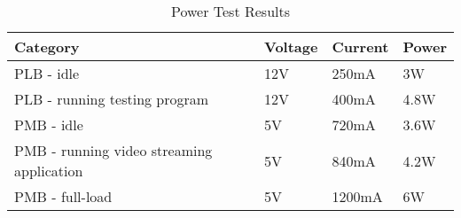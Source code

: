 \begin{table}[H]
    \caption{Power Test Results}
	\centering
	\begin{tabular}{llll}
	\hline
	\textbf{Category} & \textbf{Voltage} & \textbf{Current} & \textbf{Power} \\
	\hline
    PLB - idle & 12V & 250mA & 3W\\
    PLB - running testing program & 12V & 400mA & 4.8W\\
    PMB - idle & 5V & 720mA & 3.6W\\
    PMB - running video streaming application & 5V & 840mA & 4.2W\\
    PMB - full-load & 5V & 1200mA & 6W\\
	\hline
	\end{tabular}
\end{table}